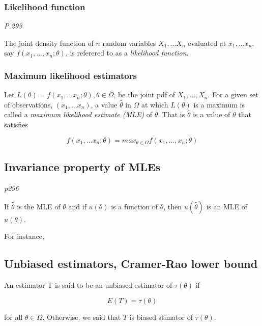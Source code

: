 \documentclass[
]{book}
\begin{document}
\hypertarget{likelihood-function}{%
\subsubsection{Likelihood function}\label{likelihood-function}}

\emph{P.293}

The joint density function of \(n\) random variables \(X_1,...X_n\) evaluated at \(x_1, ...x_n\), say \(f(x_1,...,x_n; \theta)\), is referered to as a \emph{likelihood function}.

\hypertarget{maximum-likelihood-estimators}{%
\subsubsection{Maximum likelihood estimators}\label{maximum-likelihood-estimators}}

Let \(L(\theta)=f(x_1,...x_n; \theta), \theta \in \Omega\), be the joint pdf of \(X_1, ..., X_n\). For a given set of observations, \((x_1,...x_n)\), a value \(\hat{\theta}\) in \(\Omega\) at which \(L(\theta)\) is a maximum is called a \emph{maximum likelihood estimate (MLE)} of \(\theta\). That is \(\hat{\theta}\) is a value of \(\theta\) that satisfies

\[f(x_1,...x_n; \theta)=max_{\theta \in \Omega} f(x_1, ..., x_n; \theta)\]

\hypertarget{invariance-property-of-mles}{%
\subsection{Invariance property of MLEs}\label{invariance-property-of-mles}}

\emph{p296}

If \(\hat{\theta}\) is the MLE of \(\theta\) and if \(u(\theta)\) is a function of \(\theta\), then \(u(\hat{\theta})\) is an MLE of \(u(\theta)\).

For instance,

\hypertarget{unbiased-estimators-cramer-rao-lower-bound}{%
\subsection{Unbiased estimators, Cramer-Rao lower bound}\label{unbiased-estimators-cramer-rao-lower-bound}}

An estimator T is said to be an unbiased estimator of \(\tau(\theta)\) if

\[E(T)=\tau(\theta)\]

for all \(\theta \in \Omega\). Otherwise, we said that \(T\) is biased stimator of \(\tau(\theta)\).
\end{document}
